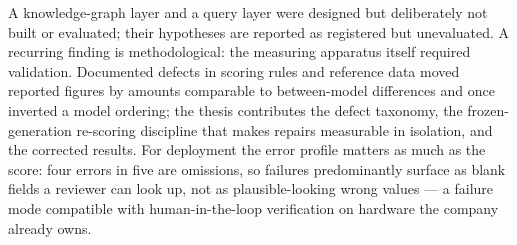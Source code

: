 A knowledge-graph layer and a query layer were designed but deliberately not
built or evaluated; their hypotheses are reported as registered but unevaluated.
A recurring finding is methodological: the measuring apparatus itself required
validation. Documented defects in scoring rules and reference data moved
reported figures by amounts comparable to between-model differences and once
inverted a model ordering; the thesis contributes the defect taxonomy, the
frozen-generation re-scoring discipline that makes repairs measurable in
isolation, and the corrected results. For deployment the error profile
matters as much as the score: four errors in five are omissions, so failures
predominantly surface as blank fields a reviewer can look up, not as
plausible-looking wrong values --- a failure mode compatible with
human-in-the-loop verification on hardware the company already owns.
